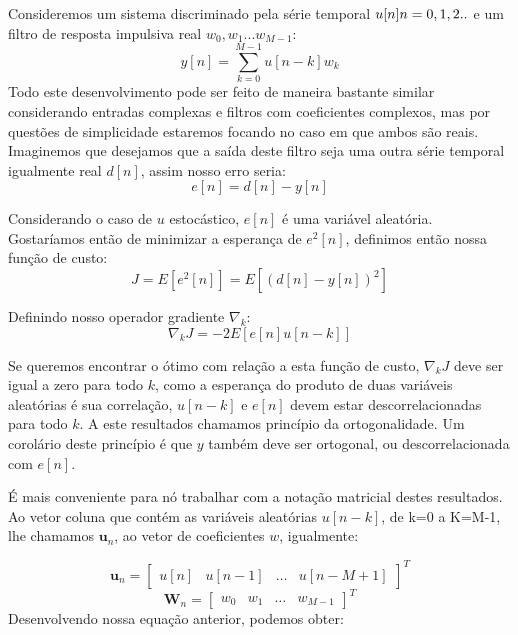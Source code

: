 \documentclass[a4paper, 12pt]{book}
\begin{document}
Consideremos um sistema discriminado pela série temporal $u[n] \space n=0,1,2..$ e um filtro de resposta impulsiva real $w_0, w_1 ... w_{M-1}$:
\begin{equation}
y[n]=\sum_{k=0}^{M-1}u[n-k]w_k
\end{equation}
Todo este desenvolvimento pode ser feito de maneira bastante similar considerando entradas complexas e filtros com coeficientes complexos, mas por questões de simplicidade estaremos focando no caso em que ambos são reais. Imaginemos que desejamos que a saída deste filtro seja uma outra série temporal igualmente real $d[n]$, assim nosso erro seria:
\begin{equation}
e[n]=d[n]-y[n]    
\end{equation}

Considerando o caso de $u$ estocástico, $e[n]$ é uma variável aleatória. Gostaríamos então de minimizar a esperança de $e^2[n]$, definimos então nossa função de custo:
\begin{equation}
J=E[e^2[n]]=E[(d[n]-y[n])^2]   
\end{equation}

Definindo nosso operador gradiente $\nabla_k$:
\begin{equation}
\nabla_k J=-2 E[e[n]u[n-k]]   
\end{equation}

Se queremos encontrar o ótimo com relação a esta função de custo, $\nabla_k J$ deve ser igual a zero para todo $k$, como a esperança do produto de duas variáveis aleatórias é sua correlação, $u[n-k]$ e $e[n]$ devem estar descorrelacionadas para todo $k$. A este resultados chamamos princípio da ortogonalidade. Um corolário deste princípio é que $y$ também deve ser ortogonal, ou descorrelacionada com $e[n]$.

\indent É mais conveniente para nó trabalhar com a notação matricial destes resultados. Ao vetor coluna que contém as variáveis aleatórias $u[n-k]$, de k=0 a K=M-1, lhe chamamos $\boldsymbol{u}_n$, ao vetor de coeficientes $w$, igualmente:

\begin{equation*}
\boldsymbol{u}_n=
\begin{bmatrix}
u[n] & u[n-1] & \dots & u[n-M+1]
\end{bmatrix}^T
\end{equation*}
\begin{equation*}
\boldsymbol{W}_n=
\begin{bmatrix}
w_0 & w_1 & \dots & w_{M-1}
\end{bmatrix}^T
\end{equation*}
Desenvolvendo nossa equação anterior, podemos obter:
\end{document}
